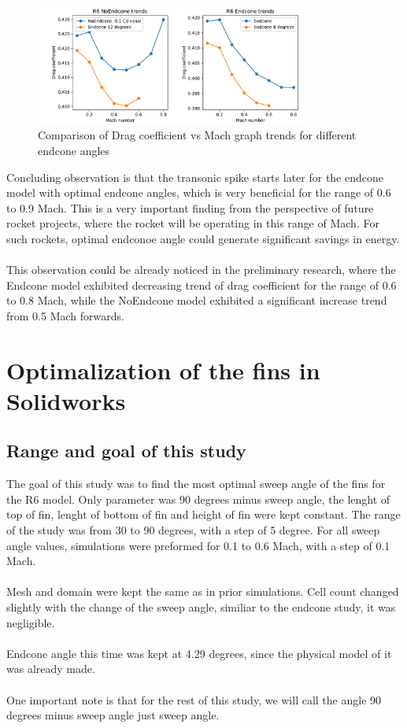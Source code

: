 \documentclass{article}
\begin{document}
\begin{figure}[H]
    \centering
    \includegraphics[width=0.8\textwidth]{../data/R6-Parametric-Endcone/comparisone2plots.pdf}
    \caption{Comparison of Drag coefficient vs Mach graph trends for different endcone angles}
\end{figure}
Concluding observation is that the transonic spike starts later for the endcone model with optimal
endcone angles, which
is very beneficial for the range of 0.6 to 0.9 Mach. This is a very important finding from the
perspective of future rocket projects, where the rocket will be operating in this range of Mach.
For such rockets, optimal endconoe angle could generate significant savings in energy.\\\\
This observation could be already noticed in the preliminary research, where the Endcone model
exhibited decreasing trend of drag coefficient for the range of 0.6 to 0.8 Mach, while the NoEndcone
model exhibited a significant increase trend from 0.5 Mach forwards.

\newpage

\section{Optimalization of the fins in Solidworks}
\subsection{Range and goal of this study}
The goal of this study was to find the most optimal sweep angle of the fins for the R6 model. 
Only parameter was 90 degrees minus sweep angle, the lenght of top of fin, lenght of bottom of fin and height of 
fin were kept constant. The range of the study was from 30 to 90 degrees, with a step of 5 degree. 
For all sweep angle values, simulations were preformed for 0.1 to 0.6 Mach, with a step of 0.1 Mach.\\\\
Mesh and domain were kept the same as in prior simulations. Cell count changed slightly with the 
change of the sweep angle, similiar to the endcone study, it was negligible.\\\\
Endcone angle this time was kept at 4.29 degrees, since the physical model of it was already made.\\\\
One important note is that for the rest of this study, we will call the angle 90 degrees minus sweep 
angle just sweep angle.\\\\
\end{document}
